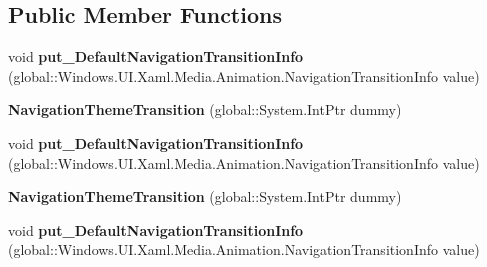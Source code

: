 \subsection*{Public Member Functions}
\begin{DoxyCompactItemize}
\item 
\mbox{\label{class_windows_1_1_u_i_1_1_xaml_1_1_media_1_1_animation_1_1_navigation_theme_transition_af07401c9d907aa1083ec63864735318d}} 
void {\bfseries put\+\_\+\+Default\+Navigation\+Transition\+Info} (global\+::\+Windows.\+U\+I.\+Xaml.\+Media.\+Animation.\+Navigation\+Transition\+Info value)
\item 
\mbox{\label{class_windows_1_1_u_i_1_1_xaml_1_1_media_1_1_animation_1_1_navigation_theme_transition_a955f8702deb50586245db661ab015571}} 
{\bfseries Navigation\+Theme\+Transition} (global\+::\+System.\+Int\+Ptr dummy)
\item 
\mbox{\label{class_windows_1_1_u_i_1_1_xaml_1_1_media_1_1_animation_1_1_navigation_theme_transition_af07401c9d907aa1083ec63864735318d}} 
void {\bfseries put\+\_\+\+Default\+Navigation\+Transition\+Info} (global\+::\+Windows.\+U\+I.\+Xaml.\+Media.\+Animation.\+Navigation\+Transition\+Info value)
\item 
\mbox{\label{class_windows_1_1_u_i_1_1_xaml_1_1_media_1_1_animation_1_1_navigation_theme_transition_a955f8702deb50586245db661ab015571}} 
{\bfseries Navigation\+Theme\+Transition} (global\+::\+System.\+Int\+Ptr dummy)
\item 
\mbox{\label{class_windows_1_1_u_i_1_1_xaml_1_1_media_1_1_animation_1_1_navigation_theme_transition_af07401c9d907aa1083ec63864735318d}} 
void {\bfseries put\+\_\+\+Default\+Navigation\+Transition\+Info} (global\+::\+Windows.\+U\+I.\+Xaml.\+Media.\+Animation.\+Navigation\+Transition\+Info value)
\item 
\mbox{\label{class_windows_1_1_u_i_1_1_xaml_1_1_media_1_1_animation_1_1_navigation_theme_transition_a955f8702deb50586245db661ab015571}} 

\end{DoxyCompactItemize}
